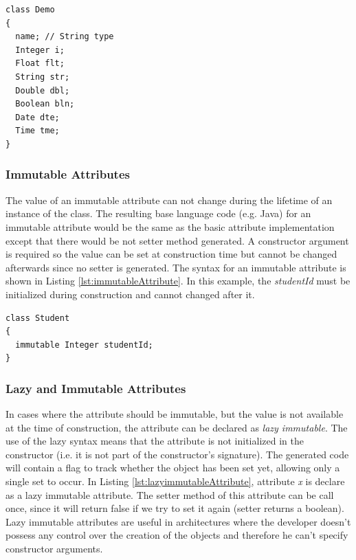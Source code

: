 
\begin{lstlisting}[style=umplePlain, label=lst:basicAttribute,caption=Basic Umple attribute]
class Demo 
{
  name; // String type
  Integer i;
  Float flt;
  String str;  
  Double dbl;
  Boolean bln;
  Date dte; 
  Time tme;
}
\end{lstlisting}

\subsubsection{Immutable Attributes}
The value of an immutable attribute can not change during the lifetime of an instance of the class. The resulting base language code (e.g. Java) for an immutable attribute would be the same as the basic attribute implementation except that there would be not setter method generated. A constructor argument is required so the value can be set at construction time but  cannot be changed afterwards since no setter is generated. The syntax for an immutable attribute is shown in Listing \ref{lst:immutableAttribute}. In this example, the \textit{studentId} must be initialized during construction and cannot changed after it. 

\begin{lstlisting}[style=umplePlain,label=lst:immutableAttribute, caption=Immutable Umple attribute]
class Student 
{
  immutable Integer studentId;
}
\end{lstlisting}

\subsubsection{Lazy and Immutable Attributes}
In cases where the attribute should be immutable, but the value is not available at the time of construction, the attribute can be declared as \textit{lazy immutable}. The use of the lazy syntax means that the attribute is not initialized in the constructor (i.e. it is not part of the constructor's signature). The generated code will contain a flag to track whether the object has been set yet, allowing only a single set to occur. In Listing \ref{lst:lazyimmutableAttribute},
attribute \textit{x} is declare as a lazy immutable attribute. The setter method of this attribute can be call once, since it will return false if we try to set it again (setter returns a boolean). Lazy immutable attributes are useful in architectures where the developer doesn't possess any control over the creation of the objects and therefore he can't specify constructor arguments.

